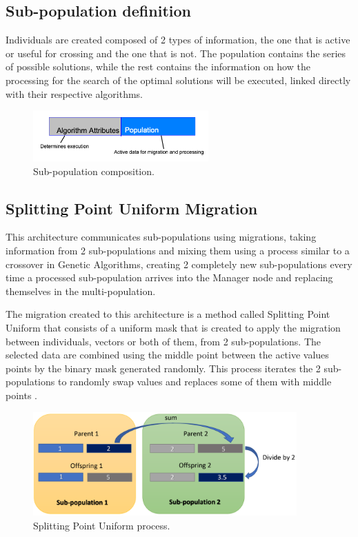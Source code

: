\documentclass[runningheads]{llncs}
\begin{document}
\subsection{Sub-population definition}

Individuals are created composed of 2 types of information, the one that is
active or useful for crossing and the one that is not. The population contains
the series of possible solutions, while the rest contains the information on how
the processing for the search of the optimal solutions will be executed, linked
directly with their respective algorithms.

\begin{figure}[htp]
  \centering
  \includegraphics[width=0.6\textwidth]{img/subpopulationDefinition.png}
  \caption{Sub-population composition.} \label{fig3}
  \end{figure}

\subsection{Splitting Point Uniform Migration}

This architecture communicates sub-populations using migrations, taking
information from 2 sub-populations and mixing them using a process similar to a
crossover in Genetic Algorithms, creating 2 completely new sub-populations every
time a processed sub-population arrives into the Manager node and replacing
themselves in the multi-population.

The migration created to this architecture is a method called Splitting Point
Uniform that consists of a uniform mask that is created to apply the migration
between individuals, vectors or both of them, from 2 sub-populations. The
selected data are combined using the middle point between the active values
points by the binary mask generated randomly. This process iterates the 2
sub-populations to randomly swap values and replaces some of them with middle
points \cite{Kramer2017,Kaya2011}.


\begin{figure}[htp]
  \centering
  \includegraphics[width=0.9\textwidth]{img/splittinPointUniform.png}
  \caption{Splitting Point Uniform process.} \label{fig4}
  \end{figure}
\end{document}
